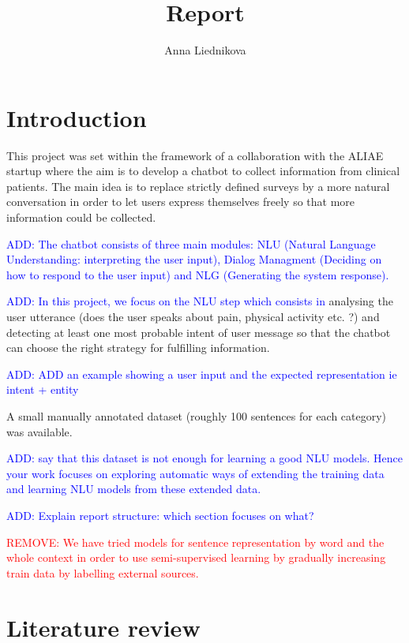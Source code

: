 \documentclass[11pt]{article}
\title{Report}
\author{Anna Liednikova}
\newcommand\add[1]{{\textcolor{blue}{ADD: #1}}}
\newcommand\remove[1]{{\textcolor{red}{REMOVE: #1}}}
\begin{document}
\maketitle

\tableofcontents

\clearpage

\section{Introduction}

 
This project was set within the framework of a collaboration with the
ALIAE startup where the aim is to develop a chatbot to collect
information from clinical patients. The main idea is to replace
strictly defined surveys by a more natural conversation in order to
let users express themselves freely so that more information could be
collected.


\add{The chatbot consists of three main modules: NLU (Natural
  Language Understanding: interpreting the user input), Dialog
  Managment (Deciding on how to respond to the user input) and NLG
  (Generating the system response).}

\add{In this project, we focus on the NLU step which consists in}
analysing the user utterance (does the user speaks about pain,
physical activity etc. ?) and detecting at least one most probable
intent of user message so that the chatbot can choose the right
strategy for fulfilling information.

\add{ADD an example showing a user input and the expected representation ie intent + entity}


A small manually annotated dataset (roughly 100 sentences for each
category) was available.

\add{say that this dataset is not enough for learning a good NLU models. Hence your work focuses on exploring automatic ways of extending the training data and 
  learning NLU models from these extended data.}

\add{Explain report structure: which section focuses on what?}


\remove{We have tried models for sentence representation by word and the whole context in order to use semi-supervised learning by gradually increasing train data by labelling external sources.}

\section{Literature review}
\end{document}
